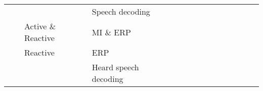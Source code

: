 \begin{tabular}{p{1.5cm}p{1.5cm}p{1.5cm}p{1.5cm}p{0.6cm}p{0.6cm}p{0.6cm}p{0.6cm}p{0.6cm}p{0.6cm}p{0.6cm}p{0.6cm}p{0.6cm}p{0.6cm}p{0.6cm}}
                                &                 &                   & Speech decoding &                                                             &                                                                                                                             &                                                                        &                      \cite{Sree2017} &                                                            &                      &                         &                               &                     &          \cite{Sun2016} &                                                                      \\
                                &                 & Active \& Reactive & MI \& ERP &                                                             &                                                                                                          \cite{Lawhern2018} &                                                                        &                                      &                                                            &                      &                         &                               &                     &                         &                                                                      \\
                                &                 & Reactive & ERP &                                                             &                                                                       \cite{Yoon2018, Volker2018, Behncke2017, Cecotti2011} &                                                                        &                                      &                                                            &                      &                         &                               &                     &                         &                                                                      \\
                                &                 &                   & Heard speech decoding &                                                             &                                                                                                                             &                                                                        &                                      &                                                            &                      &                         &                               &                     &                         &                                                \cite{Moinnereau2018} \\

\end{tabular}
